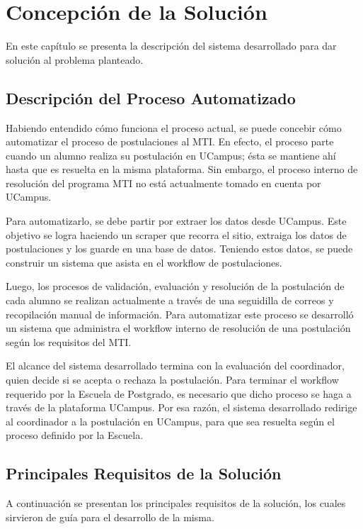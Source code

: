 \chapter{Concepción de la Solución}

En este capítulo se presenta la descripción del sistema desarrollado para dar
solución al problema planteado.

\section{Descripción del Proceso Automatizado}

Habiendo entendido cómo funciona el proceso actual, se puede concebir cómo
automatizar el proceso de postulaciones al MTI. En efecto, el proceso parte
cuando un alumno realiza su postulación en UCampus; ésta se mantiene ahí hasta
que es resuelta en la misma plataforma. Sin embargo, el proceso interno de
resolución del programa MTI no está actualmente tomado en cuenta por UCampus.

Para automatizarlo, se debe partir por extraer los datos desde UCampus. Este
objetivo se logra haciendo un scraper que recorra el sitio, extraiga los datos
de postulaciones y los guarde en una base de datos. Teniendo estos datos, se
puede construir un sistema que asista en el workflow de postulaciones.

Luego, los procesos de validación, evaluación y resolución de la postulación de
cada alumno se realizan actualmente a través de una seguidilla de correos y
recopilación manual de información. Para automatizar este proceso se desarrolló
un sistema que administra el workflow interno de resolución de una postulación
según los requisitos del MTI.

El alcance del sistema desarrollado termina con la evaluación del coordinador,
quien decide si se acepta o rechaza la postulación. Para terminar el workflow
requerido por la Escuela de Postgrado, es necesario que dicho proceso se haga a
través de la plataforma UCampus. Por esa razón, el sistema desarrollado redirige
al coordinador a la postulación en UCampus, para que sea resuelta según el
proceso definido por la Escuela.

\section{Principales Requisitos de la Solución}

A continuación se presentan los principales requisitos de la solución, los
cuales sirvieron de guía para el desarrollo de la misma.

